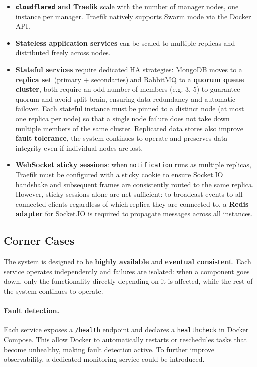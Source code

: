 \begin{itemize}
  \item \textbf{\texttt{cloudflared} and Traefik} scale with the number of manager nodes, one instance per manager. Traefik natively supports Swarm mode via the Docker API.
  \item \textbf{Stateless application services} can be scaled to multiple replicas and distributed freely across nodes.
  \item \textbf{Stateful services} require dedicated HA strategies: MongoDB moves to a \textbf{replica set} (primary + secondaries) and RabbitMQ to a \textbf{quorum queue cluster}, both require an odd number of members (e.g. 3, 5) to guarantee quorum and avoid split-brain, ensuring data redundancy and automatic failover. Each stateful instance must be pinned to a distinct node (at most one replica per node) so that a single node failure does not take down multiple members of the same cluster. Replicated data stores also improve \textbf{fault tolerance}, the system continues to operate and preserves data integrity even if individual nodes are lost.
  \item \textbf{WebSocket sticky sessions}: when \texttt{notification} runs as multiple replicas, Traefik must be configured with a sticky cookie to ensure Socket.IO handshake and subsequent frames are consistently routed to the same replica. However, sticky sessions alone are not sufficient: to broadcast events to all connected clients regardless of which replica they are connected to, a \textbf{Redis adapter} for Socket.IO is required to propagate messages across all instances.
\end{itemize}

\subsection{Corner Cases}

The system is designed to be \textbf{highly available} and \textbf{eventual consistent}. Each service operates independently and failures are isolated: when a component goes down, only the functionality directly depending on it is affected, while the rest of the system continues to operate.

\paragraph{Fault detection.}
Each service exposes a \texttt{/health} endpoint and declares a \texttt{healthcheck} in Docker Compose. This allow Docker to automatically restarts or reschedules tasks that become unhealthy, making fault detection active. To further improve observability, a dedicated monitoring service could be introduced.

